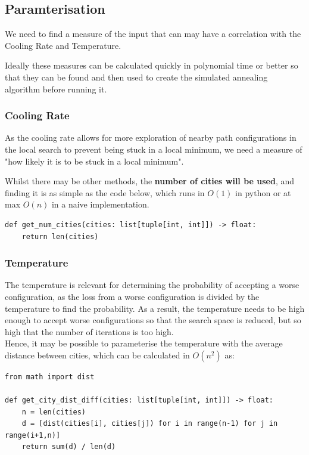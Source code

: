 \documentclass{article}
\begin{document}
\subsection{Paramterisation}

We need to find a measure of the input that can may have a correlation with the Cooling Rate and Temperature.

Ideally these measures can be calculated quickly in polynomial time or better so that they can be found and then used to create the simulated annealing algorithm before running it.

\subsubsection{Cooling Rate}

As the cooling rate allows for more exploration of nearby path configurations in the local search to prevent being stuck in a local minimum, we need a measure of "how likely it is to be stuck in a local minimum".

Whilst there may be other methods, the \textbf{number of cities will be used}, and finding it is as simple as the code below, which runs in $O(1)$ in python or at max $O(n)$ in a naive implementation.

\begin{verbatim}
def get_num_cities(cities: list[tuple[int, int]]) -> float:
    return len(cities)
\end{verbatim}

\subsubsection{Temperature}

The temperature is relevant for determining the probability of accepting a worse configuration, as the loss from a worse configuration is divided by the temperature to find the probability.
As a result, the temperature needs to be high enough to accept worse configurations so that the search space is reduced, but so high that the number of iterations is too high.
\\

Hence, it may be possible to parameterise the temperature with the average distance between cities, which can be calculated in $O(n^2)$ as:

\begin{verbatim}
from math import dist

def get_city_dist_diff(cities: list[tuple[int, int]]) -> float:
    n = len(cities)
    d = [dist(cities[i], cities[j]) for i in range(n-1) for j in range(i+1,n)]
    return sum(d) / len(d)
\end{verbatim}
\end{document}
